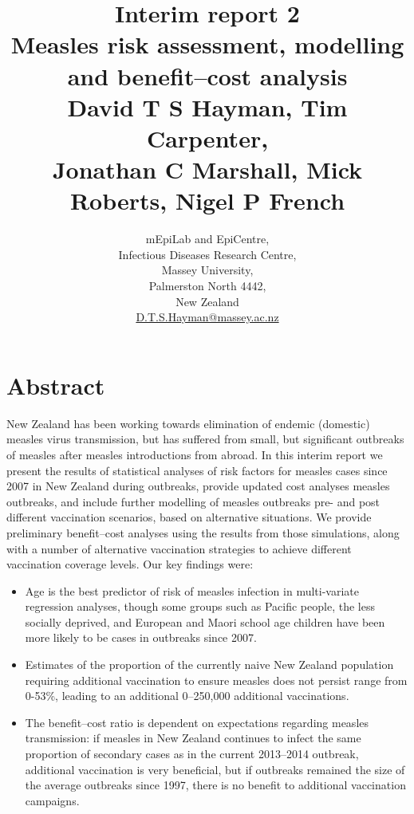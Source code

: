 \documentclass{article}
\begin{document}


\title{Interim report 2\\ Measles risk assessment, modelling and benefit--cost analysis\\ \vspace{2 mm} {\large David T S Hayman, Tim Carpenter,\\ Jonathan C Marshall, Mick Roberts, Nigel P French}}
\author{mEpiLab and EpiCentre,\\ Infectious Diseases Research Centre,\\
Massey University,\\
Palmerston North 4442,\\
New Zealand\\
\href{mailto: D.T.S.Hayman@massey.ac.nz}{D.T.S.Hayman@massey.ac.nz}}  %
\maketitle

\section{Abstract}

New Zealand has been working towards elimination of endemic (domestic) measles virus transmission, but has suffered from small, but significant outbreaks of measles after measles introductions from abroad. In this interim report we present the results of statistical analyses of risk factors for measles cases since 2007 in New Zealand during outbreaks, provide updated cost analyses measles outbreaks, and include further modelling of measles outbreaks pre- and post different vaccination scenarios, based on alternative situations. We provide preliminary benefit--cost analyses using the results from those simulations, along with a number of alternative vaccination strategies to achieve different vaccination coverage levels. Our key findings were:
\begin{itemize}
\item Age is the best predictor of risk of measles infection in multi-variate regression analyses, though some groups such as Pacific people, the less socially deprived, and European and Maori school age children have been more likely to be cases in outbreaks since 2007.
\item Estimates of the proportion of the currently naive New Zealand population requiring additional vaccination to ensure measles does not persist range from 0-53\%, leading to an additional 0--250,000 additional vaccinations.
\item The benefit--cost ratio is dependent on expectations regarding measles transmission: if measles in New Zealand continues to infect the same proportion of secondary cases as in the current 2013--2014 outbreak, additional vaccination is very beneficial, but if outbreaks remained the size of the average outbreaks since 1997, there is no benefit to additional vaccination campaigns.
\end{itemize}
\end{document}
